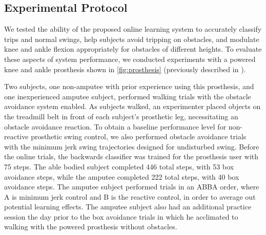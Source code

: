 \subsection{Experimental Protocol}

We tested the ability of the proposed online learning system to accurately
classify trips and normal swings, help subjects avoid tripping on obstacles, and
modulate knee and ankle flexion appropriately for obstacles of different
heights. To evaluate these aspects of system performance, we conducted
experiments with a powered knee and ankle prosthesis shown in
\cref{fig:prosthesis} (previously described in \citet{thatte2018method}).

Two subjects, one non-amputee with prior experience using this prosthesis, and
one inexperienced amputee subject, performed walking trials with the obstacle
avoidance system enabled.  As subjects walked, an experimenter placed objects on
the treadmill belt in front of each subject's prosthetic leg, necessitating an
obstacle avoidance reaction. To obtain a baseline performance level for
non-reactive prosthetic swing control, we also performed obstacle avoidance
trials with the minimum jerk swing trajectories designed for undisturbed swing.
Before the online trials, the backwards classifier was trained for the
prosthesis user with 75 steps. The able bodied subject completed 446 total
steps, with 53 box avoidance steps, while the amputee completed 222 total steps,
with 40 box avoidance steps. The amputee subject performed trials in an ABBA
order, where A is minimum jerk control and B is the reactive control, in order
to average out potential learning effects. The amputee subject also had an
additional practice session the day prior to the box avoidance trials in which
he acclimated to walking with the powered prosthesis without obstacles.
